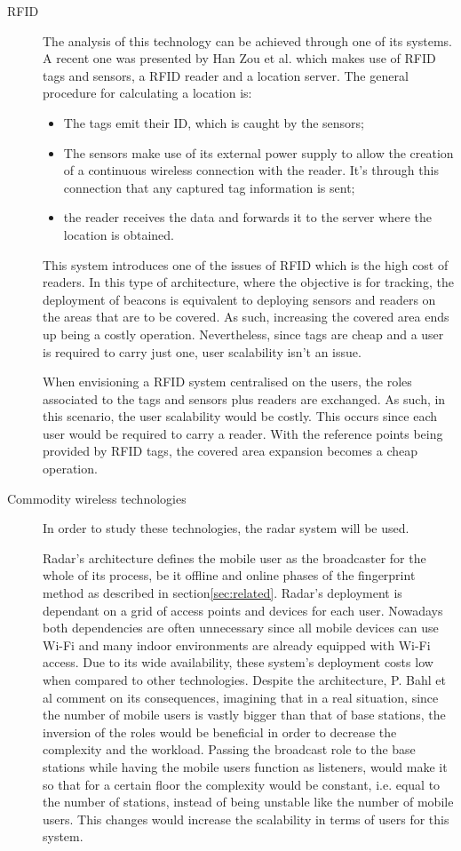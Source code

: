  
\begin{description} 
\item [\acf{RFID}]  The analysis of this technology can be achieved through one of its systems. A recent one was presented by Han Zou et al. \cite{rfid_sys} which makes use of RFID tags and sensors, a \ac{RFID} reader and a location server. The general procedure for calculating a location is:  
\begin{itemize} 
\item The tags emit their ID, which is caught by the sensors; 
\item The sensors make use of its external power supply to allow the creation of a continuous wireless connection with the reader. It's through this connection that any captured tag information is sent; 
\item the reader receives the data and forwards it to the server where the location is obtained. 
\end{itemize} 
This system introduces one of the issues of RFID which is the high cost of readers. 
In this type of architecture, where the objective is for tracking, the deployment of beacons is equivalent to deploying sensors and readers on the areas that are to be covered. As such, increasing the covered area ends up being a costly operation. Nevertheless, since tags are cheap and a user is required to carry just one, user scalability isn't an issue. 
 
 
When envisioning a \ac{RFID} system centralised on the users, the roles associated to the tags and sensors plus readers are exchanged. As such, in this scenario, the user scalability would be costly. This occurs since each user would be required to carry a reader. With the reference points being provided by \ac{RFID} tags, the covered area expansion becomes a cheap operation. 
 
 
\item[Commodity wireless technologies] In order to study these technologies, the radar system will be used. 
 
 
Radar's architecture defines the mobile user as the broadcaster for the whole of its process, be it offline and online phases of the fingerprint method as described in section\ref{sec:related}. Radar's deployment is dependant on a grid of access points and devices for each user. Nowadays both dependencies are often unnecessary since all mobile devices can use Wi-Fi and many indoor environments are already equipped with Wi-Fi access. Due to its wide availability, these system's deployment costs low when compared to other technologies.  
Despite the architecture, P. Bahl et al\cite{radar1} comment on its consequences, imagining that in a real situation, since the number of mobile users is vastly bigger than that of base stations, the inversion of the roles would be beneficial in order to decrease the complexity and the workload. 
Passing the broadcast role to the base stations while having the mobile users function as listeners, would make it so that for a certain floor the complexity would be constant, i.e. equal to the number of stations, instead of being unstable like the number of mobile users. This changes would increase the scalability in terms of users for this system. 
 

\end{description}
